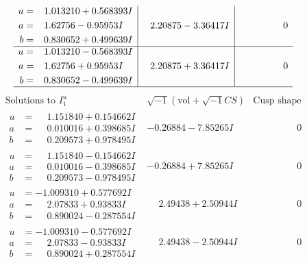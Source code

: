 \documentclass[1p]{elsarticle_modified}
\theoremstyle{definition}
\newcommand{\I}{\sqrt{-1}}
\begin{document}
$$\begin{array}{c|c|c}
\begin{aligned}
u &= \phantom{-}1.013210 + 0.568393 I \\
a &= \phantom{-}1.62756 - 0.95953 I \\
b &= \phantom{-}0.830652 + 0.499639 I\end{aligned}
 & \phantom{-}2.20875 - 3.36417 I & \phantom{-0.000000 } 0 \\ \hline\begin{aligned}
u &= \phantom{-}1.013210 - 0.568393 I \\
a &= \phantom{-}1.62756 + 0.95953 I \\
b &= \phantom{-}0.830652 - 0.499639 I\end{aligned}
 & \phantom{-}2.20875 + 3.36417 I & \phantom{-0.000000 } 0\\
 \hline 
 \end{array}$$\newpage$$\begin{array}{c|c|c}  
\text{Solutions to }I^u_{1}& \I (\text{vol} + \sqrt{-1}CS) & \text{Cusp shape}\\
 \hline 
\begin{aligned}
u &= \phantom{-}1.151840 + 0.154662 I \\
a &= \phantom{-}0.010016 + 0.398685 I \\
b &= \phantom{-}0.209573 + 0.978495 I\end{aligned}
 & -0.26884 - 7.85265 I & \phantom{-0.000000 } 0 \\ \hline\begin{aligned}
u &= \phantom{-}1.151840 - 0.154662 I \\
a &= \phantom{-}0.010016 - 0.398685 I \\
b &= \phantom{-}0.209573 - 0.978495 I\end{aligned}
 & -0.26884 + 7.85265 I & \phantom{-0.000000 } 0 \\ \hline\begin{aligned}
u &= -1.009310 + 0.577692 I \\
a &= \phantom{-}2.07833 + 0.93833 I \\
b &= \phantom{-}0.890024 - 0.287554 I\end{aligned}
 & \phantom{-}2.49438 + 2.50944 I & \phantom{-0.000000 } 0 \\ \hline\begin{aligned}
u &= -1.009310 - 0.577692 I \\
a &= \phantom{-}2.07833 - 0.93833 I \\
b &= \phantom{-}0.890024 + 0.287554 I\end{aligned}
 & \phantom{-}2.49438 - 2.50944 I & \phantom{-0.000000 } 0 \\ \hline\begin{aligned}

\end{aligned}
\end{array}$$
\end{document}
